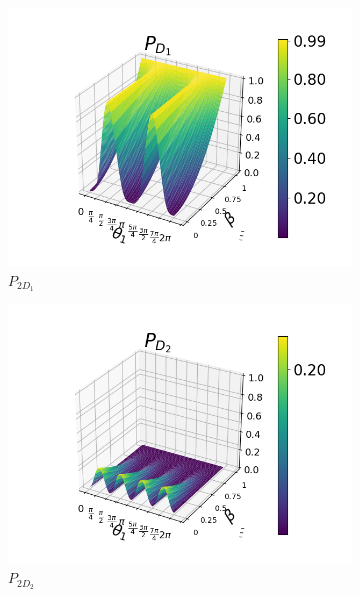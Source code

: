 \documentclass[12pt]{book}
\begin{document}
\begin{figure}[t]
\centering
\begin{subfigure}[b]{0.4\linewidth}
\includegraphics[width=\linewidth]{images/PD1_h.png}
\caption{$P_{2D_{1}}$}
\label{fig:BS1}
\end{subfigure}
\begin{subfigure}[b]{0.4\linewidth}
\includegraphics[width=\linewidth]{images/PD2_h.png}
\caption{$P_{2D_{2}}$}
\label{fig:westminster_aerea}
\end{subfigure}
\begin{subfigure}[b]{0.4\linewidth}

\end{subfigure}
\end{figure}
\end{document}
